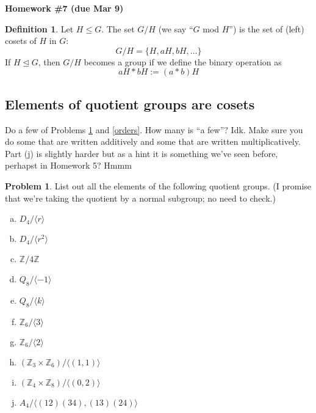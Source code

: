 \documentclass[12pt]{article}
\theoremstyle{definition} %
\newtheorem{problem}{Problem}
\newtheorem*{definition}{Definition}
\newcommand{\Alert}[1]{\textcolor{xRed}{#1}}
\newcommand{\Z}{\mathbb{Z}}
\def\<{\langle}
\def\>{\rangle}
\def\normaleq{\unlhd}
\renewcommand{\section}[1]{\begin{center} \textbf{#1} \\\end{center}}
\begin{document}
\section{Homework \#7 (due Mar 9)} %

\begin{definition}
    Let $H \leq G$. The set $G/H$ (we say ``$G$ mod $H$'') is the set of (left) cosets of $H$ in $G$: 
    \[G/H = \{H, aH, bH, \ldots\}\]
    If $H\normaleq G$, then $G/H$ becomes a group if we define the binary operation as
    \[aH \ast bH := (a\ast b)H\]
\end{definition}

\subsection*{Elements of quotient groups are cosets}

Do \Alert{a few of} Problems \ref{elements} and \ref{orders}. How many is \Alert{``a few''}? Idk. Make sure you do some that are written additively and some that are written multiplicatively. Part (j) is slightly harder but as a hint it is something we've seen before, perhapst in Homework 5? Hmmm

\begin{problem}\label{elements}
    List out all the elements of the following quotient groups. (I promise that we're taking the quotient by a normal subgroup; no need to check.)
    \begin{multicols}{2}
        \begin{enumerate}[(a)]
            \item $D_4 / \< r \>$
            \item $D_4 / \< r^2 \>$
            \item $\Z / 4\Z$
            \item $Q_8 / \< -1 \>$
            \item $Q_8 / \< k \>$
            \item $\Z_6 / \< 3 \>$
            \item $\Z_6 / \< 2 \>$
            \item $(\Z_3 \times \Z_6) / \< (1, 1) \>$
            \item $(\Z_4 \times \Z_8) / \< (0 ,2) \>$
            \item $A_4 / \<(12)(34), (13)(24)\>$
        \end{enumerate}
    \end{multicols}
\end{problem}
\end{document}
